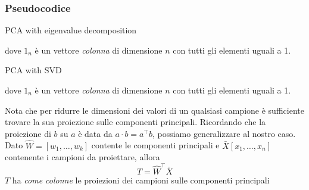 \subsubsection{Pseudocodice}



\begin{algoritmo}{PCA with eigenvalue decomposition}
	\begin{algorithm}[H]
		\vskip3mm

	\end{algorithm}
	dove $ 1_n $ è un vettore \textit{colonna} di dimensione $ n $ con tutti gli elementi uguali a 1.
\end{algoritmo}

\begin{algoritmo}{PCA with SVD}
	\begin{algorithm}[H]
		\vskip3mm

	\end{algorithm}
	dove $ 1_n $ è un vettore \textit{colonna} di dimensione $ n $ con tutti gli elementi uguali a 1.
\end{algoritmo}
\vskip3mm
Nota che per ridurre le dimensioni dei valori di un qualsiasi campione è sufficiente trovare la sua proiezione sulle componenti principali. Ricordando che la proiezione di $ b $ su $ a $ è data da $ a \cdot b  = a^{\top} b$, possiamo generalizzare al nostro caso.
\vskip3mm
Dato $ \hat{W} = \left[w_1, \ldots ,w_k\right] $ contente le componenti principali e $ \bar{X}\left[x_1, \ldots ,x_n\right] $ contenente i campioni da proiettare, allora
\[
	T = \hat{W}^{\top} \bar{X}
\]
$ T $ ha \textit{come colonne} le proiezioni dei campioni sulle componenti principali

